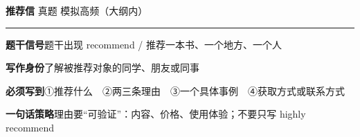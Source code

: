 \documentclass[11pt,a4paper]{ctexart}
\begin{document}
\clearpage
{}\label{g12}
\noindent{\color{accent}\rule{\linewidth}{1.5pt}}\par\vspace{3pt}
\hspace{6pt}
{\LARGE\bfseries 推荐信}\hfill
{\footnotesize\color{gray} 真题 模拟高频（大纲内）}\par
\vspace{1pt}
{\color{accent!35}\rule{\linewidth}{0.5pt}}\par\vspace{3pt}
{\footnotesize {\color{accent}\bfseries 题干信号}\quad 题干出现 recommend / 推荐一本书、一个地方、一个人}\par
{\footnotesize {\color{accent}\bfseries 写作身份}\quad 了解被推荐对象的同学、朋友或同事}\par
{\footnotesize {\color{accent}\bfseries 必须写到}\quad ①推荐什么　②两三条理由　③一个具体事例　④获取方式或联系方式}\par
{\footnotesize {\color{accent}\bfseries 一句话策略}\quad 理由要“可验证”：内容、价格、使用体验；不要只写 highly recommend}\par
\end{document}

